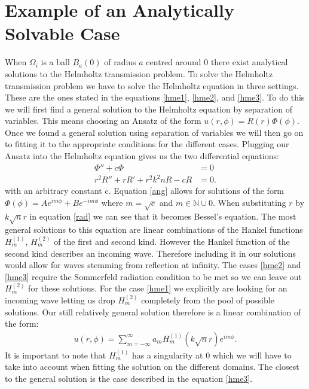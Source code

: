 \documentclass[a4paper, oneside]{discothesis}
\begin{document}
\section{Example of an Analytically Solvable Case} \label{sec:asc}
When $\Omega_i$ is a ball $B_a(0)$ of radius $a$ centred around $0$ there exist analytical solutions to the Helmholtz transmission problem. 
To solve the Helmholtz transmission problem we have to solve the Helmholtz equation in three settings. 
These are the ones stated in the equations \ref{hme1}, \ref{hme2}, and \ref{hme3}. 
To do this we will first find a general solution to the Helmholtz equation by separation of variables. 
This means choosing an Ansatz of the form $u(r,\phi)=R(r)\Phi(\phi)$.
Once we found a general solution using separation of variables we will then go on to fitting it to the appropriate conditions for the different cases.
Plugging our Ansatz into the Helmholtz equation gives us the two differential equations:
\begin{align}
	\Phi'' + c\Phi &= 0 \label{ang}\\
	r^2R'' + rR' + r^2k^2nR - cR &= 0 \label{rad}.
\end{align}
with an arbitrary constant c.
Equation \ref{ang} allows for solutions of the form $\Phi(\phi) = Ae^{im\phi} + Be^{-im\phi}$ where $m = \sqrt{c}$ and $m \in \mathbb{N} \cup {0}$. 
When substituting $r$ by $k\sqrt{n}r$ in equation \ref{rad} we can see that it becomes Bessel's equation.
The most general solutions to this equation are linear combinations of the Hankel functions $H_m^{(1)}$, $H_m^{(2)}$ of the first and second kind.
However the Hankel function of the second kind describes an incoming wave.
Therefore including it in our solutions would allow for waves stemming from reflection at infinity.
The cases \ref{hme2} and \ref{hme3} require the Sommerfeld radiation condition to be met so we can leave out $H_m^{(2)}$ for these solutions.
For the case \ref{hme1} we explicitly are looking for an incoming wave letting us drop $H_m^{(2)}$ completely from the pool of possible solutions.
Our still relatively general solution therefore is a linear combination of the form:
\begin{align}
	u(r,\phi) = \sum_{m=-\infty}^{\infty} a_m H_m^{(1)}(k\sqrt{n}r)e^{im\phi}.
\end{align}
It is important to note that $H_m^{(1)}$ has a singularity at $0$ which we will have to take into account when fitting the solution on the different domains.
The closest to the general solution is the case described in the equation \ref{hme3}.
\end{document}
